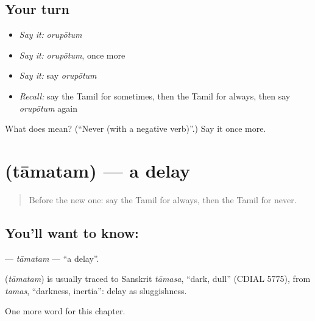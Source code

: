 \subsection*{Your turn}
\begin{itemize}
\raggedright
  \item \emph{Say it:} \emph{orupōtum}
  \item \emph{Say it:} \emph{orupōtum}, once more
  \item \emph{Say it:} say \emph{orupōtum}
  \item \emph{Recall:} say the Tamil for sometimes, then the Tamil for always, then say \emph{orupōtum} again
\end{itemize}

\begin{tcolorbox}[breakable,colback=teal!4,colframe=teal!35!black,title={Before you move on}]
What does  mean? (\textquotedblleft{}Never (with a negative verb)\textquotedblright{}.) Say it once more.
\end{tcolorbox}
\section[\texorpdfstring{\ta{தாமதம்} (tāmatam)}{தாமதம் (tāmatam)}]{ (tāmatam) — a delay}

\label{lesson:TA-C171-tamatam}



\begin{quote}
Before the new one: say the Tamil for always, then the Tamil for never.
\end{quote}

\subsection*{You'll want to know: }
\textbf{} — \emph{tāmatam} — \textquotedblleft{}a delay\textquotedblright{}.

\begin{cousinweb}
\textbf{} (\emph{tāmatam}) is usually traced to Sanskrit \emph{tāmasa}, \textquotedblleft{}dark, dull\textquotedblright{} (CDIAL 5775), from \emph{tamas}, \textquotedblleft{}darkness, inertia\textquotedblright{}: delay as sluggishness.
\end{cousinweb}

\begin{grammarlens}[title={What you've built}]
One more word for this chapter.
\end{grammarlens}

